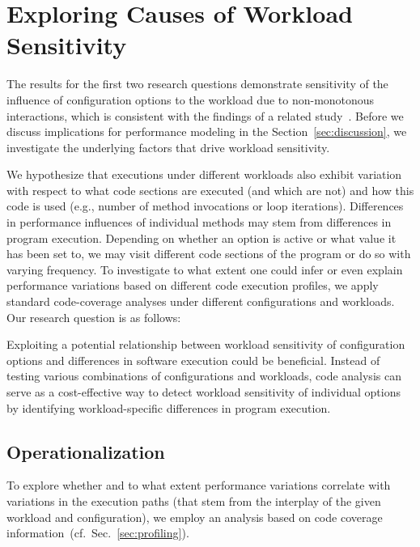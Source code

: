 {{{{}

\label{sec:rq3}\label{sec:categories}
\section{Exploring Causes of Workload Sensitivity}\label{sec:new_section}
The results for the first two research questions demonstrate sensitivity of the influence of configuration options to the workload due to non-monotonous interactions, which is consistent with the findings of a related study~\cite{lesoil_2021}. Before we discuss implications for performance modeling in the Section~\ref{sec:discussion}, we investigate the underlying factors that drive workload sensitivity.

We hypothesize that executions under different workloads also exhibit variation with respect to what code sections are executed (and which are not) and how this code is used (e.g., number of method invocations or loop iterations). Differences in performance influences of individual methods may stem from differences in program execution. Depending on whether an option is active or what value it has been set to, we may visit different code sections of the program or do so with varying frequency.
To investigate to what extent one could infer or even explain performance variations based on different code execution profiles, we apply standard code-coverage analyses under different configurations and workloads. Our research question is as follows:


Exploiting a potential relationship between workload sensitivity of configuration options and differences in software execution could be beneficial. Instead of testing various combinations of configurations and workloads, code analysis can serve as a cost-effective way to detect workload sensitivity of individual options by identifying workload-specific differences in program execution.

\subsection{Operationalization}To explore whether and to what extent performance variations correlate with variations in the execution paths (that stem from the interplay of the given workload and configuration), we employ an analysis based on code coverage information~(cf.~Sec.~\ref{sec:profiling}). 

}}}
